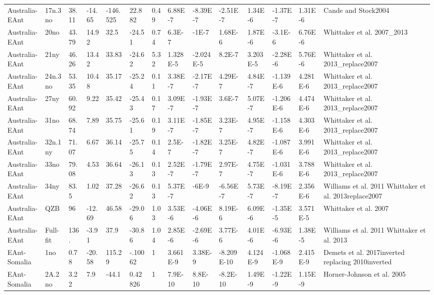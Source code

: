 \begin{landscape}
\begin{longtable}{@{}lllllllllllll>{\scriptsize}p{3.1cm}@{}}
Australia-EAnt & 17n.3no & 38.11 & -14.65 & -146.525 & 22.882 & 0.49 & 6.88E-7 & -8.39E-7 & -2.51E-7 & 1.34E-6 & -1.37E-7 & 1.31E-6 & Cande and Stock2004 \\
Australia-EAnt & 20no & 43.79 & 14.92 & 32.5 & -24.51 & 0.74 & 6.3E-7 & -1E-7 & 1.68E-6 & 1.87E-6 & -3.1E-6 & 6.76E-6 & Whittaker et al. 2007\_2013 \\
Australia-EAnt & 21ny & 46.26 & 13.42 & 33.83 & -24.62 & 5.32 & 1.328E-5 & -2.024E-5 & 8.2E-7 & 3.203E-5 & -2.28E-6 & 5.76E-6 & Whittaker et al. 2013\_replace2007 \\
Australia-EAnt & 24n.3no & 53.35 & 10.48 & 35.17 & -25.24 & 0.11 & 3.38E-7 & -2.17E-7 & 4.29E-7 & 4.84E-7 & -1.139E-6 & 4.281E-6 & Whittaker et al. 2013\_replace2007 \\
Australia-EAnt & 27ny & 60.92 & 9.22 & 35.42 & -25.43 & 0.17 & 3.09E-7 & -1.93E-7 & 3.6E-7 & 5.07E-7 & -1.206E-6 & 4.474E-6 & Whittaker et al. 2013\_replace2007 \\
Australia-EAnt & 31no & 68.74 & 7.89 & 35.75 & -25.61 & 0.19 & 3.11E-7 & -1.85E-7 & 3.23E-7 & 4.95E-7 & -1.158E-6 & 4.303E-6 & Whittaker et al. 2013\_replace2007 \\
Australia-EAnt & 32n.1ny & 71.07 & 6.67 & 36.14 & -25.75 & 0.14 & 2.5E-7 & -1.82E-7 & 3.25E-7 & 4.82E-7 & -1.087E-6 & 3.991E-6 & Whittaker et al. 2013\_replace2007 \\
Australia-EAnt & 33no & 79.08 & 4.53 & 36.64 & -26.13 & 0.13 & 2.52E-7 & -1.79E-7 & 2.97E-7 & 4.75E-7 & -1.031E-6 & 3.788E-6 & Whittaker et al. 2013\_replace2007 \\
Australia-EAnt & 34ny & 83.5 & 1.02 & 37.28 & -26.62 & 0.13 & 5.37E-7 & -6E-9 & -6.56E-7 & 5.73E-7 & -8.19E-7 & 2.356E-6 & Williams et al. 2011 Whittaker et al. 2013replace2007 \\
Australia-EAnt & QZB & 96 & -12.69 & 46.58 & -29.06 & 1.03 & 3.53E-6 & -4.06E-6 & 8.19E-6 & 6.09E-6 & -1.35E-5 & 3.571E-5 & Whittaker et al. 2007 \\
Australia-EAnt & Full-fit & 136. & -3.91 & 37.9 & -30.86 & 1.04 & 2.85E-6 & -2.69E-6 & 3.77E-6 & 4.01E-6 & -6.93E-6 & 1.38E-5 & Williams et al. 2011 Whittaker et al. 2013 \\
EAnt-Somalia & 1no & 0.78 & -20.58 & 115.29 & -.10062 & 1 & 3.661E-9 & 3.38E-9 & -8.209E-10 & 4.124E-9 & -1.068E-9 & 2.415E-9 & Demets et al. 2017inverted replacing 2010inverted \\
EAnt-Somalia & 2A.2no & 3.22 & 7.9 & -44.1 & 0.42826 & 1 & 7.9E-10 & 8.8E-10 & -8.2E-10 & 1.49E-9 & -1.22E-9 & 1.15E-9 & Horner-Johnson et al. 2005 \\

\end{longtable}
\end{landscape}
